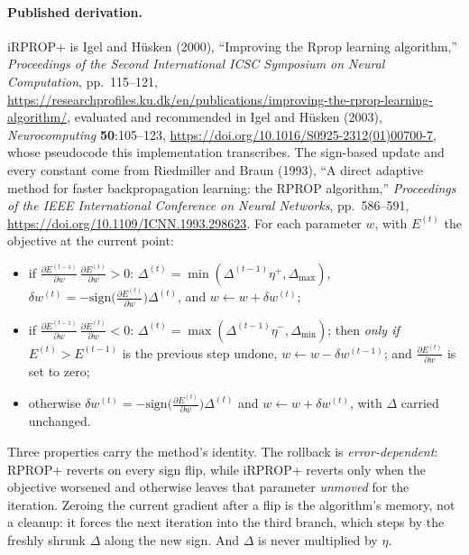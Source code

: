 \paragraph{Published derivation.}  iRPROP+ is Igel and H\"usken (2000),
``Improving the Rprop learning algorithm,'' \emph{Proceedings of the Second
International ICSC Symposium on Neural Computation}, pp.~115--121,
\url{https://researchprofiles.ku.dk/en/publications/improving-the-rprop-learning-algorithm/},
evaluated and recommended in Igel and H\"usken (2003), \emph{Neurocomputing}
\textbf{50}:105--123, \url{https://doi.org/10.1016/S0925-2312(01)00700-7}, whose
pseudocode this implementation transcribes.  The sign-based update and every
constant come from Riedmiller and Braun (1993), ``A direct adaptive method for
faster backpropagation learning: the RPROP algorithm,'' \emph{Proceedings of the
IEEE International Conference on Neural Networks}, pp.~586--591,
\url{https://doi.org/10.1109/ICNN.1993.298623}.  For each parameter $w$, with
$E^{(t)}$ the objective at the current point:

\begin{itemize}
\item if $\frac{\partial E^{(t-1)}}{\partial w}\,
      \frac{\partial E^{(t)}}{\partial w} > 0$:
      $\Delta^{(t)} = \min(\Delta^{(t-1)}\eta^{+}, \Delta_{\max})$,
      $\delta w^{(t)} = -\mathrm{sign}
      \bigl(\frac{\partial E^{(t)}}{\partial w}\bigr)\Delta^{(t)}$, and
      $w \leftarrow w + \delta w^{(t)}$;
\item if $\frac{\partial E^{(t-1)}}{\partial w}\,
      \frac{\partial E^{(t)}}{\partial w} < 0$:
      $\Delta^{(t)} = \max(\Delta^{(t-1)}\eta^{-}, \Delta_{\min})$; then
      \emph{only if} $E^{(t)} > E^{(t-1)}$ is the previous step undone,
      $w \leftarrow w - \delta w^{(t-1)}$; and
      $\frac{\partial E^{(t)}}{\partial w}$ is set to zero;
\item otherwise $\delta w^{(t)} = -\mathrm{sign}
      \bigl(\frac{\partial E^{(t)}}{\partial w}\bigr)\Delta^{(t)}$ and
      $w \leftarrow w + \delta w^{(t)}$, with $\Delta$ carried unchanged.
\end{itemize}

Three properties carry the method's identity.  The rollback is
\emph{error-dependent}: RPROP+ reverts on every sign flip, while iRPROP+ reverts
only when the objective worsened and otherwise leaves that parameter
\emph{unmoved} for the iteration.  Zeroing the current gradient after a flip is
the algorithm's memory, not a cleanup: it forces the next iteration into the
third branch, which steps by the freshly shrunk $\Delta$ along the new sign.
And $\Delta$ is never multiplied by $\eta$.


